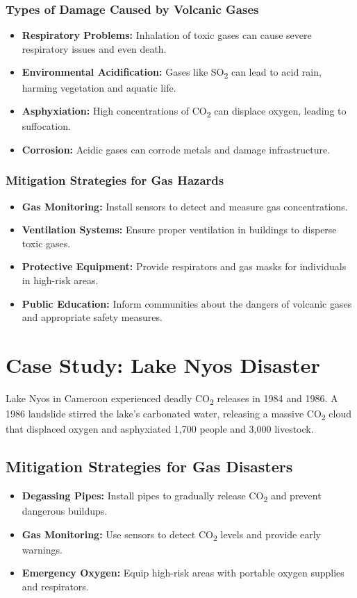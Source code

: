 \documentclass{article}
\begin{document}
\subsubsection{Types of Damage Caused by Volcanic Gases}
\begin{itemize}
    \item \textbf{Respiratory Problems:} Inhalation of toxic gases can cause severe respiratory issues and even death.
    \item \textbf{Environmental Acidification:} Gases like SO\textsubscript{2} can lead to acid rain, harming vegetation and aquatic life.
    \item \textbf{Asphyxiation:} High concentrations of CO\textsubscript{2} can displace oxygen, leading to suffocation.
    \item \textbf{Corrosion:} Acidic gases can corrode metals and damage infrastructure.
\end{itemize}

\subsubsection{Mitigation Strategies for Gas Hazards}
\begin{itemize}
    \item \textbf{Gas Monitoring:} Install sensors to detect and measure gas concentrations.
    \item \textbf{Ventilation Systems:} Ensure proper ventilation in buildings to disperse toxic gases.
    \item \textbf{Protective Equipment:} Provide respirators and gas masks for individuals in high-risk areas.
    \item \textbf{Public Education:} Inform communities about the dangers of volcanic gases and appropriate safety measures.
\end{itemize}

\section{Case Study: Lake Nyos Disaster}
Lake Nyos in Cameroon experienced deadly CO\textsubscript{2} releases in 1984 and 1986. A 1986 landslide stirred the lake's carbonated water, releasing a massive CO\textsubscript{2} cloud that displaced oxygen and asphyxiated 1,700 people and 3,000 livestock.

\subsection{Mitigation Strategies for Gas Disasters}
\begin{itemize}
    \item \textbf{Degassing Pipes:} Install pipes to gradually release CO\textsubscript{2} and prevent dangerous buildups.
    \item \textbf{Gas Monitoring:} Use sensors to detect CO\textsubscript{2} levels and provide early warnings.
    \item \textbf{Emergency Oxygen:} Equip high-risk areas with portable oxygen supplies and respirators.
\end{itemize}
\end{document}
